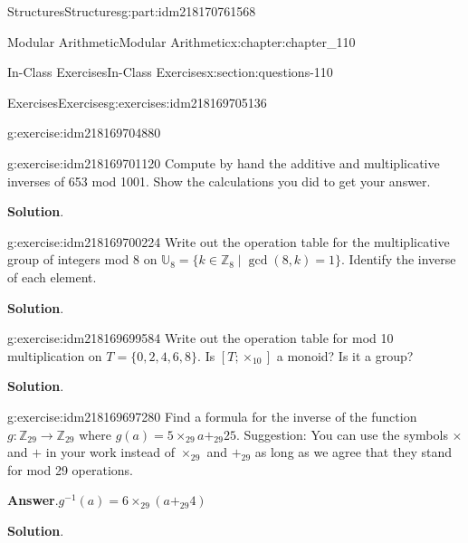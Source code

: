 \documentclass[oneside,10pt,]{book}
\newcommand{\blocktitlefont}{\relax}
\numberwithin{equation}{section}
\begin{document}
\begin{partptx}{Structures}{}{Structures}{}{}{g:part:idm218170761568}
\begin{chapterptx}{Modular Arithmetic}{}{Modular Arithmetic}{}{}{x:chapter:chapter_110}
\begin{sectionptx}{In-Class Exercises}{}{In-Class Exercises}{}{}{x:section:questions-110}
\begin{exercises-subsection-numberless}{Exercises}{}{Exercises}{}{}{g:exercises:idm218169705136}
\begin{exercisegroup}
\begin{divisionexerciseeg}{1}{}{}{g:exercise:idm218169704880}
\end{divisionexerciseeg}%
\begin{divisionexerciseeg}{2}{}{}{g:exercise:idm218169701120}%
Compute by hand the additive and multiplicative inverses of 653 mod 1001. Show the calculations you did to get your answer.%
\par\smallskip%
\noindent\textbf{\blocktitlefont Solution}.\hypertarget{g:solution:idm218169700480}{}\quad{}%
\end{divisionexerciseeg}%
\begin{divisionexerciseeg}{3}{}{}{g:exercise:idm218169700224}%
Write out the operation table for the multiplicative group of integers mod 8  on \(\mathbb{U}_8= \{k \in \mathbb{Z}_8 \mid \gcd{(8,k)}=1\}\).  Identify the inverse of each element.%
\par\smallskip%
\noindent\textbf{\blocktitlefont Solution}.\hypertarget{g:solution:idm218169699152}{}\quad{}%
\end{divisionexerciseeg}%
\begin{divisionexerciseeg}{4}{}{}{g:exercise:idm218169699584}%
Write out the operation table for mod 10 multiplication on \(T=\{0,2,4,6,8\}\). Is \([T;\times_{10}]\)	 a monoid? Is it a group?%
\par\smallskip%
\noindent\textbf{\blocktitlefont Solution}.\hypertarget{g:solution:idm218169697536}{}\quad{}%
\end{divisionexerciseeg}%
\begin{divisionexerciseeg}{5}{}{}{g:exercise:idm218169697280}%
Find a formula for the inverse of the function \(g: \mathbb{Z}_{29} \rightarrow  \mathbb{Z}_{29}\) where \(g(a)= 5\times_{29}a +_{29}25\).  Suggestion:  You can use the symbols \(\times\) and \(+\) in your work instead of \(\times_{29}\) and \(+_{29}\) as long as we agree that they stand for mod 29 operations.%
\par\smallskip%
\noindent\textbf{\blocktitlefont Answer}.\hypertarget{g:answer:idm218169696896}{}\quad{}\(g^{-1}(a) = 6 \times_{29}(a +_{29} 4)\)%
\par\smallskip%
\noindent\textbf{\blocktitlefont Solution}.\hypertarget{g:solution:idm218169693344}{}\quad{}%
\end{divisionexerciseeg}%
\end{exercisegroup}
\par\medskip\noindent
\end{exercises-subsection-numberless}
\end{sectionptx}
\end{chapterptx}
%
\typeout{************************************************}

\end{partptx}
\end{document}
